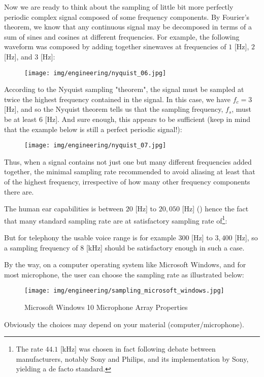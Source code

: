 	Now we are ready to think about the sampling of little bit more perfectly periodic complex signal composed of some frequency components. By Fourier's theorem, we know that any continuous signal may be decomposed in terms of a sum of sines and cosines at different frequencies. For example, the following waveform was composed by adding together sinewaves at frequencies of $1$ [Hz], $2$ [Hz], and $3$ [Hz]:
	\begin{figure}[H]
		\centering
		\texttt{[image: img/engineering/nyquist\_06.jpg]}
	\end{figure}
	According to the Nyquist sampling "theorem", the signal must be sampled at twice the highest frequency contained in the signal. In this case, we have $f_c=3$ [Hz], and so the Nyquist theorem tells us that the sampling frequency, $f_s$, must be at least $6$ [Hz]. And sure enough, this appears to be sufficient (keep in mind that the example below is still a perfect periodic signal!):
	\begin{figure}[H]
		\centering
		\texttt{[image: img/engineering/nyquist\_07.jpg]}
	\end{figure}
	Thus, when a signal contains not just one but many different frequencies added together, the minimal sampling rate recommended to avoid aliasing at least that of the highest frequency, irrespective of how many other frequency components there are.
	
	The human ear capabilities is between $20$ [Hz] to $20,050$ [Hz] () hence the fact that many standard sampling rate are at satisfactory sampling rate of\footnote{The rate $44.1$ [kHz] was chosen in fact following debate between manufacturers, notably Sony and Philips, and its implementation by Sony, yielding a de facto standard.}:
	
	But for telephony the usable voice range is for example $300$ [Hz] to $3,400$ [Hz], so a sampling frequency of $8$ [kHz] should be satisfactory enough in such a case.
	
	By the way, on a computer operating system like Microsoft Windows, and for most microphone, the user can choose the sampling rate as illustrated below:
	\begin{figure}[H]
		\centering
		\texttt{[image: img/engineering/sampling\_microsoft\_windows.jpg]}
		\caption[]{Microsoft Windows 10 Microphone Array Properties}
	\end{figure}
	Obviously the choices may depend on your material (computer/microphone).
	

